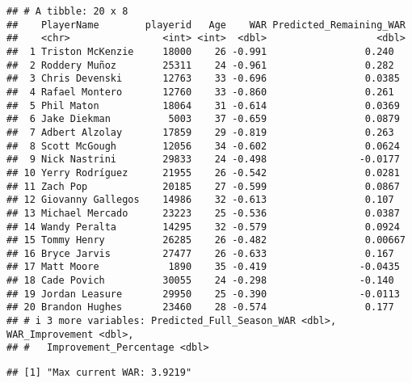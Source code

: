 \documentclass[
]{article}
\newenvironment{Shaded}{\begin{snugshade}}{\end{snugshade}}
\newcommand{\CommentTok}[1]{\textcolor[rgb]{0.56,0.35,0.01}{\textit{#1}}}
\newcommand{\FunctionTok}[1]{\textcolor[rgb]{0.13,0.29,0.53}{\textbf{#1}}}
\newcommand{\NormalTok}[1]{#1}
\newcommand{\SpecialCharTok}[1]{\textcolor[rgb]{0.81,0.36,0.00}{\textbf{#1}}}
\newcommand{\StringTok}[1]{\textcolor[rgb]{0.31,0.60,0.02}{#1}}
\begin{document}
\begin{verbatim}
## # A tibble: 20 x 8
##    PlayerName        playerid   Age    WAR Predicted_Remaining_WAR
##    <chr>                <int> <int>  <dbl>                   <dbl>
##  1 Triston McKenzie     18000    26 -0.991                 0.240  
##  2 Roddery Muñoz        25311    24 -0.961                 0.282  
##  3 Chris Devenski       12763    33 -0.696                 0.0385 
##  4 Rafael Montero       12760    33 -0.860                 0.261  
##  5 Phil Maton           18064    31 -0.614                 0.0369 
##  6 Jake Diekman          5003    37 -0.659                 0.0879 
##  7 Adbert Alzolay       17859    29 -0.819                 0.263  
##  8 Scott McGough        12056    34 -0.602                 0.0624 
##  9 Nick Nastrini        29833    24 -0.498                -0.0177 
## 10 Yerry Rodríguez      21955    26 -0.542                 0.0281 
## 11 Zach Pop             20185    27 -0.599                 0.0867 
## 12 Giovanny Gallegos    14986    32 -0.613                 0.107  
## 13 Michael Mercado      23223    25 -0.536                 0.0387 
## 14 Wandy Peralta        14295    32 -0.579                 0.0924 
## 15 Tommy Henry          26285    26 -0.482                 0.00667
## 16 Bryce Jarvis         27477    26 -0.633                 0.167  
## 17 Matt Moore            1890    35 -0.419                -0.0435 
## 18 Cade Povich          30055    24 -0.298                -0.140  
## 19 Jordan Leasure       29950    25 -0.390                -0.0113 
## 20 Brandon Hughes       23460    28 -0.574                 0.177  
## # i 3 more variables: Predicted_Full_Season_WAR <dbl>, WAR_Improvement <dbl>,
## #   Improvement_Percentage <dbl>
\end{verbatim}

\begin{Shaded}
\end{Shaded}

\begin{verbatim}
## [1] "Max current WAR: 3.9219"
\end{verbatim}

\begin{Shaded}
\end{Shaded}
\end{document}

